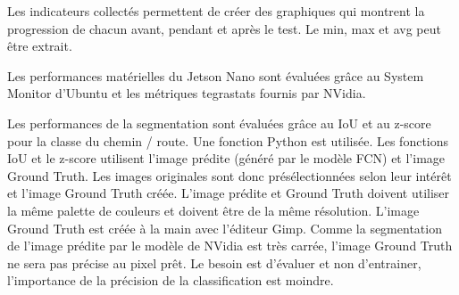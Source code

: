 \par Les indicateurs collectés permettent de créer des graphiques qui montrent la progression de chacun avant, pendant et après le test.  Le min, max et avg peut être extrait.
\par Les performances matérielles du Jetson Nano sont évaluées grâce au System Monitor d’Ubuntu et les métriques tegrastats fournis par NVidia.
\par Les performances de la segmentation sont évaluées grâce au IoU et au z-score pour la classe du chemin / route. Une fonction Python est utilisée. Les fonctions IoU et le z-score utilisent l'image prédite (généré par le modèle FCN) et l'image Ground Truth. Les images originales sont donc présélectionnées selon leur intérêt et l'image Ground Truth créée. L'image prédite et Ground Truth doivent utiliser la même palette de couleurs et doivent être de la même résolution. 
L'image Ground Truth est créée à la main avec l'éditeur Gimp. Comme la segmentation de l'image prédite par le modèle de NVidia est très carrée, l'image Ground Truth ne sera pas précise au pixel prêt. Le besoin est d'évaluer et non d'entrainer, l'importance de la précision de la classification est moindre. 